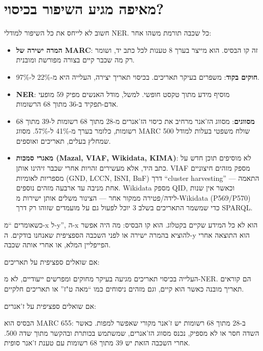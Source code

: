 \documentclass[12pt,a4paper]{article}
\begin{document}
\section{\texthebrew{מאיפה מגיע השיפור בכיסוי?}}
\begin{hebrew}
חשוב לא לייחס את כל השיפור למודלי NER. כל שכבה תורמת משהו אחר:
\begin{itemize}
  \item \textbf{המרה ישירה של MARC}: זה קו הבסיס. הוא מייצר בערך 8 טענות לכל כתב יד, ושומר רק מה שכבר קיים בצורה מפורשת ומובנית.
  \item \textbf{חוקים בקוד}: משפרים בעיקר תאריכים. בכיסוי תאריך יצירה, העלייה היא מ-22\% ל-97\%.
  \item \textbf{NER}: מוסיף מידע מתוך טקסט חופשי. למשל, מודל האנשים מפיק 59 מופעי אדם-תפקיד ב-36 מתוך 68 הרשומות.
  \item \textbf{מסווגים}: מסווג הז'אנר מרחיב את כיסוי הז'אנרים מ-28 מתוך 68 רשומות ל-39 מתוך 68 רשומות, כלומר בערך מ-41\% ל-57\%. מסווג MARC 500 שולח משפטי בעלות למודל שמחלץ בעלים, תאריכים ואוספים.
  \item \textbf{מאגרי סמכות (Mazal, VIAF, Wikidata, KIMA)}: לא מוסיפים תוכן חדש על כתב היד, אלא מעשירים זהויות אחרי שכבר זיהינו אותן. VIAF מספק מזהים חיצוניים מספריות לאומיות (GND, LCCN, ISNI, BnF) דרך ``cluster harvesting'' --- התאמה אחת מניבה עד ארבעה מזהים נוספים. Wikidata מספק QID, וכאשר אין שנות לידה/פטירה ממקור אחר --- הצינור משלים אותן ישירות מ-Wikidata (P569/P570) כדי שמשמר התאריכים בשלב 3 יוכל לפעול גם על מועמדים שזוהו רק דרך SPARQL.
\end{itemize}
\par
כשאומרים ``מ-x ל-y'', ה-x הוא לא כל המידע שקיים בקטלוג. הוא קו הבסיס: מה היה אפשר להוציא בהמרה ישירה או לפני השכבה הספציפית שאנחנו בודקים. ה-y הוא התוצאה אחרי הפייפליין המלא, או אחרי אותה שכבה.
\par
אם שואלים ספציפית על תאריכים:
\par
העלייה בכיסוי תאריכים מגיעה בעיקר מחוקים ומפרשים ייעודיים, לא מ-NER. הם קוראים תאריך מובנה כאשר הוא קיים, וגם מזהים ניסוחים כמו ``מאה ט"ז'' או תאריכים חלקיים.
\par
אם שואלים ספציפית על ז'אנרים:
\par
הבסיס הוא MARC 655: ב-28 מתוך 68 רשומות יש ז'אנר מקורי שאפשר למפות. כאשר השדה חסר או לא מספיק, נכנס מסווג הז'אנרים, שמשתמש בכותרת ובהקשר מתוך שדה 500. אחרי השכבה הזאת יש 39 מתוך 68 רשומות עם טענת ז'אנר סופית.
\end{hebrew}
\end{document}
